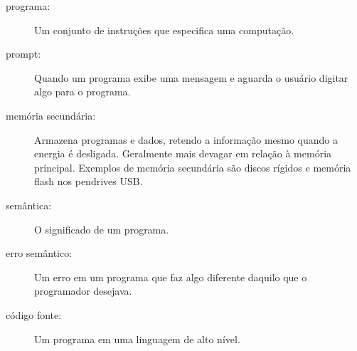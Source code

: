 \begin{description}
\item[programa:] Um conjunto de instruções que especifica uma computação.
%

\item[prompt:] Quando um programa exibe uma mensagem e aguarda o usuário
digitar algo para o programa.
%

\item[memória secundária:] Armazena programas e dados, retendo a informação
mesmo quando a energia é desligada.  Geralmente mais devagar
em relação à memória principal. Exemplos de memória secundária são
discos rígidos e memória flash nos pendrives USB.
%

\item[semântica:]  O significado de um programa.
%

\item[erro semântico:] Um erro em um programa que faz algo diferente
daquilo que o programador desejava.
%

\item[código fonte:] Um programa em uma linguagem de alto nível.
%

\end{description}
%

